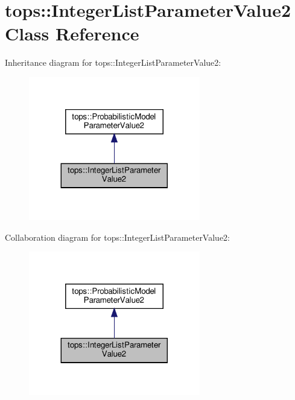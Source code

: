 \hypertarget{classtops_1_1IntegerListParameterValue2}{}\section{tops\+:\+:Integer\+List\+Parameter\+Value2 Class Reference}
\label{classtops_1_1IntegerListParameterValue2}


Inheritance diagram for tops\+:\+:Integer\+List\+Parameter\+Value2\+:
\nopagebreak
\begin{figure}[H]
\begin{center}
\leavevmode
\includegraphics[width=212pt]{classtops_1_1IntegerListParameterValue2__inherit__graph}
\end{center}
\end{figure}


Collaboration diagram for tops\+:\+:Integer\+List\+Parameter\+Value2\+:
\nopagebreak
\begin{figure}[H]
\begin{center}
\leavevmode
\includegraphics[width=212pt]{classtops_1_1IntegerListParameterValue2__coll__graph}
\end{center}
\end{figure}
